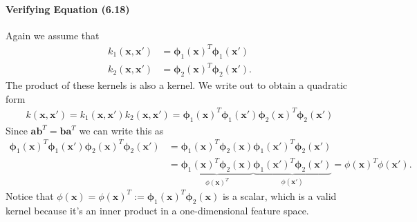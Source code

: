 \documentclass[12pt, a4paper]{article}
\newcommand{\vect}[1]{\bm{#1}}
\begin{document}
\paragraph{Verifying Equation (6.18)}
Again we assume that 
\begin{align*}
k_1(\vect{x}, \vect{x}') &=
\vect{\phi}_1 \left( \vect{x} \right)^T \vect{\phi}_1 \left( \vect{x}' \right) \\
k_2(\vect{x}, \vect{x}') &=
\vect{\phi}_2 \left( \vect{x} \right)^T \vect{\phi}_2 \left( \vect{x}' \right).
\end{align*}
The product of these kernels is also a kernel.
We write out to obtain a quadratic form
\begin{align*}
k(\vect{x}, \vect{x}') 
= k_1(\vect{x}, \vect{x}')  k_2(\vect{x}, \vect{x}') = \vect{\phi}_1 \left( \vect{x} \right)^T \vect{\phi}_1 \left( \vect{x}' \right)
 \vect{\phi}_2 \left( \vect{x} \right)^T \vect{\phi}_2 \left( \vect{x}' \right) 
\end{align*}
Since $\vect{a}\vect{b}^T = \vect{b}\vect{a}^T$ we can write this as
\begin{align*}
\vect{\phi}_1 \left( \vect{x} \right)^T \vect{\phi}_1 \left( \vect{x}' \right)
\vect{\phi}_2 \left( \vect{x} \right)^T \vect{\phi}_2 \left( \vect{x}' \right) 
&=
\vect{\phi}_1 \left( \vect{x} \right)^T \vect{\phi}_2 \left( \vect{x} \right)
\vect{\phi}_1 \left( \vect{x}' \right)^T \vect{\phi}_2 \left( \vect{x}' \right) 
\\
&= \underbrace{\vect{\phi}_1 \left( \vect{x} \right)^T \vect{\phi}_2 \left( \vect{x} \right)}_{\phi(\vect{x})^T}
\underbrace{\vect{\phi}_1 \left( \vect{x}' \right)^T \vect{\phi}_2 \left( \vect{x}' \right) }_{\phi(\vect{x}')}
= \phi(\vect{x})^T \phi(\vect{x}').
\end{align*}
Notice that $\phi(\vect{x}) = \phi(\vect{x})^T := \vect{\phi}_1 \left( \vect{x} \right)^T \vect{\phi}_2 \left( \vect{x} \right)$ is a scalar, which is a valid kernel because it's an inner product in a one-dimensional feature space.
\end{document}
